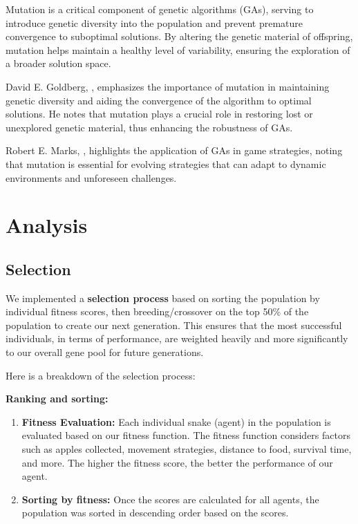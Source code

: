 \documentclass[a4paper, twocolumn]{article}
\begin{document}
Mutation is a critical component of genetic algorithms (GAs), serving to introduce genetic diversity into the population and prevent premature convergence to suboptimal solutions. By altering the genetic material of offspring, mutation helps maintain a healthy level of variability, ensuring the exploration of a broader solution space.

David E. Goldberg, \cite{goldberg1989genetic}, emphasizes the importance of mutation in maintaining genetic diversity and aiding the convergence of the algorithm to optimal solutions. He notes that mutation plays a crucial role in restoring lost or unexplored genetic material, thus enhancing the robustness of GAs.

Robert E. Marks, \cite{marks2001playing}, highlights the application of GAs in game strategies, noting that mutation is essential for evolving strategies that can adapt to dynamic environments and unforeseen challenges.

\section{Analysis\label{sec:Analysis}}

\subsection{Selection\label{sec:Selection_analysis}}
We implemented a \textbf{selection process} based on sorting the population by individual fitness scores, then breeding/crossover on the top 50\% of the population to create our next generation. This ensures that the most successful individuals, in terms of performance, are weighted heavily and more significantly to our overall gene pool for future generations. 

Here is a breakdown of the selection process: 

\textbf{Ranking and sorting:}
\begin{enumerate}
    \item \textbf{Fitness Evaluation:} Each individual snake (agent) in the population is evaluated based on our fitness function. The fitness function considers factors such as apples collected, movement strategies, distance to food, survival time, and more. The higher the fitness score, the better the performance of our agent. 
    \item \textbf{Sorting by fitness:} Once the scores are calculated for all agents, the population was sorted in descending order based on the scores. 
\end{enumerate}
\end{document}
